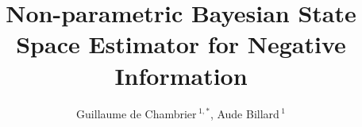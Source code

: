 \documentclass{frontiersSCNS} %
\def\firstAuthorLast{Guillaume de Chambrier {et~al.}} %
\def\Authors{Guillaume de Chambrier\,$^{1,*}$, Aude Billard\,$^{1}$}
\begin{document}
\onecolumn
{}

\title[Non-parametric BSSE for NF]{Non-parametric {Bayesian State Space Estimator} for Negative Information} 

\author[\firstAuthorLast ]{\Authors} %
\address{} %
\correspondance{} %

\extraAuth{}%


\maketitle


\end{document}

